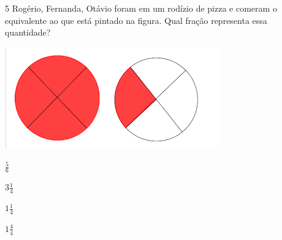 
\num{5} Rogério, Fernanda, Otávio foram em um rodízio de pizza e comeram o
equivalente ao que está pintado na figura. Qual fração representa essa
quantidade?

\includegraphics[width=3.625in,height=1.72917in]{./imgSAEB_7_MAT/media/image95.png}

\begin{escolha}
\item $\frac{5}{6}$
\item $3\frac{1}{4}$
\item $1\frac{1}{4}$
\item $1\frac{4}{4}$
\end{escolha}




